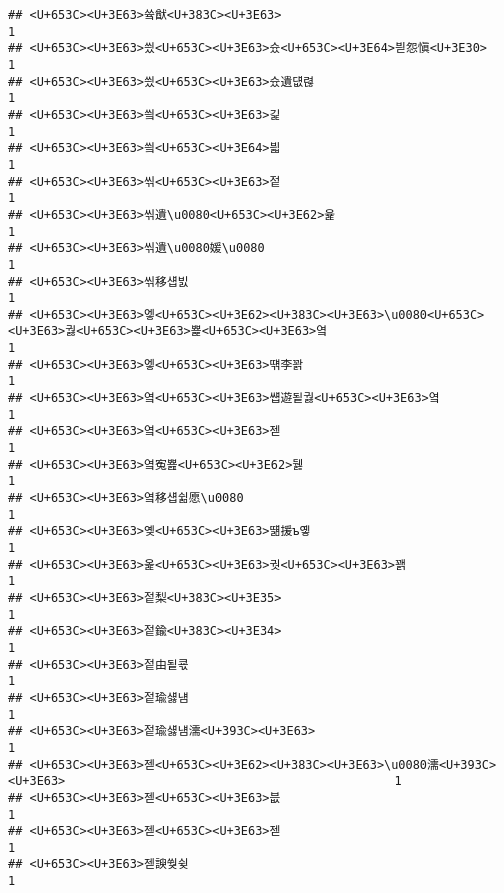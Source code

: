 \documentclass[]{article}
\begin{document}
\begin{verbatim}
## <U+653C><U+3E63>쓬猷<U+383C><U+3E63>                                                            1
## <U+653C><U+3E63>씠<U+653C><U+3E63>슜<U+653C><U+3E64>븯怨愼<U+3E30>                                                1
## <U+653C><U+3E63>씠<U+653C><U+3E63>슜遺덊렪                                                      1
## <U+653C><U+3E63>씤<U+653C><U+3E63>긽                                                            1
## <U+653C><U+3E63>씤<U+653C><U+3E64>븳                                                            1
## <U+653C><U+3E63>씪<U+653C><U+3E63>젙                                                            1
## <U+653C><U+3E63>씪遺\u0080<U+653C><U+3E62>윭                                                    1
## <U+653C><U+3E63>씪遺\u0080媛\u0080                                                  1
## <U+653C><U+3E63>씪移섑빐                                                            1
## <U+653C><U+3E63>엫<U+653C><U+3E62><U+383C><U+3E63>\u0080<U+653C><U+3E63>궗<U+653C><U+3E63>뾽<U+653C><U+3E63>옄                                  1
## <U+653C><U+3E63>엫<U+653C><U+3E63>떆李꽑                                                        1
## <U+653C><U+3E63>옄<U+653C><U+3E63>썝遊됱궗<U+653C><U+3E63>옄                                                1
## <U+653C><U+3E63>옄<U+653C><U+3E63>젣                                                            1
## <U+653C><U+3E63>옄寃뾾<U+653C><U+3E62>뒗                                                        1
## <U+653C><U+3E63>옄移섑쉶愿\u0080                                                    1
## <U+653C><U+3E63>옞<U+653C><U+3E63>떎援ъ옣                                                      1
## <U+653C><U+3E63>옱<U+653C><U+3E63>궛<U+653C><U+3E63>꽭                                                      1
## <U+653C><U+3E63>젙梨<U+383C><U+3E35>                                                            1
## <U+653C><U+3E63>젙鍮<U+383C><U+3E34>                                                            1
## <U+653C><U+3E63>젙由됱쿇                                                            1
## <U+653C><U+3E63>젙瑜섏냼                                                            1
## <U+653C><U+3E63>젙瑜섏냼濡<U+393C><U+3E63>                                                      1
## <U+653C><U+3E63>젣<U+653C><U+3E62><U+383C><U+3E63>\u0080濡<U+393C><U+3E63>                                              1
## <U+653C><U+3E63>젣<U+653C><U+3E63>븞                                                            1
## <U+653C><U+3E63>젣<U+653C><U+3E63>젣                                                            1
## <U+653C><U+3E63>젣諛쒖슂                                                            1

\end{verbatim}
\end{document}
